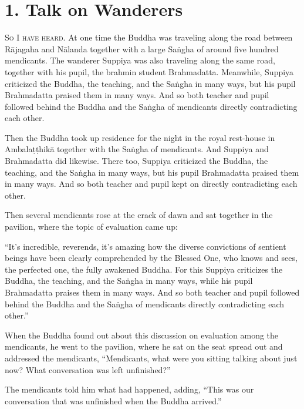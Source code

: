 \documentclass[12pt,openany]{book}%
\newcommand*{\scevam}[1]{\textsc{#1}}
\begin{document}
\section*{1. Talk on Wanderers }

\scevam{So I have heard. }At one time the Buddha was traveling along the road between \textsanskrit{Rājagaha} and \textsanskrit{Nālanda} together with a large \textsanskrit{Saṅgha} of around five hundred mendicants. The wanderer Suppiya was also traveling along the same road, together with his pupil, the brahmin student Brahmadatta. Meanwhile, Suppiya criticized the Buddha, the teaching, and the \textsanskrit{Saṅgha} in many ways, but his pupil Brahmadatta praised them in many ways. And so both teacher and pupil followed behind the Buddha and the \textsanskrit{Saṅgha} of mendicants directly contradicting each other. 

Then the Buddha took up residence for the night in the royal rest-house in \textsanskrit{Ambalaṭṭhikā} together with the \textsanskrit{Saṅgha} of mendicants. And Suppiya and Brahmadatta did likewise. There too, Suppiya criticized the Buddha, the teaching, and the \textsanskrit{Saṅgha} in many ways, but his pupil Brahmadatta praised them in many ways. And so both teacher and pupil kept on directly contradicting each other. 

Then several mendicants rose at the crack of dawn and sat together in the pavilion, where the topic of evaluation came up: 

“It’s incredible, reverends, it’s amazing how the diverse convictions of sentient beings have been clearly comprehended by the Blessed One, who knows and sees, the perfected one, the fully awakened Buddha. For this Suppiya criticizes the Buddha, the teaching, and the \textsanskrit{Saṅgha} in many ways, while his pupil Brahmadatta praises them in many ways. And so both teacher and pupil followed behind the Buddha and the \textsanskrit{Saṅgha} of mendicants directly contradicting each other.” 

When the Buddha found out about this discussion on evaluation among the mendicants, he went to the pavilion, where he sat on the seat spread out and addressed the mendicants, “Mendicants, what were you sitting talking about just now? What conversation was left unfinished?” 

The mendicants told him what had happened, adding, “This was our conversation that was unfinished when the Buddha arrived.” 
\end{document}
